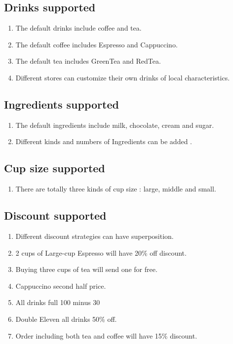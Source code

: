 \documentclass[a4paper]{report}
\begin{document}
\subsection{Drinks supported}
\begin{enumerate}
\item The default drinks include coffee and tea.
\item The default coffee includes Espresso and Cappuccino.
\item The default tea includes GreenTea and RedTea.
\item Different stores can customize their own drinks of local characteristics.
\end{enumerate}

\subsection{Ingredients supported}
\begin{enumerate}
\item The default ingredients include milk, chocolate, cream and sugar.
\item Different kinds and numbers of Ingredients can be added .
\end{enumerate}

\subsection{Cup size supported}
\begin{enumerate}
\item There are totally three kinds of cup size : large, middle and small.
\end{enumerate}

\subsection{Discount supported}
\begin{enumerate}
\item Different discount strategies can have superposition.
\item 2 cups of Large-cup Espresso will have 20\% off discount.
\item Buying three cups of tea will send one for free.
\item Cappuccino second half price.
\item All drinks full 100 minus 30
\item Double Eleven all drinks 50\% off.
\item Order including both tea and coffee will have 15\% discount.
\end{enumerate}
\end{document}
